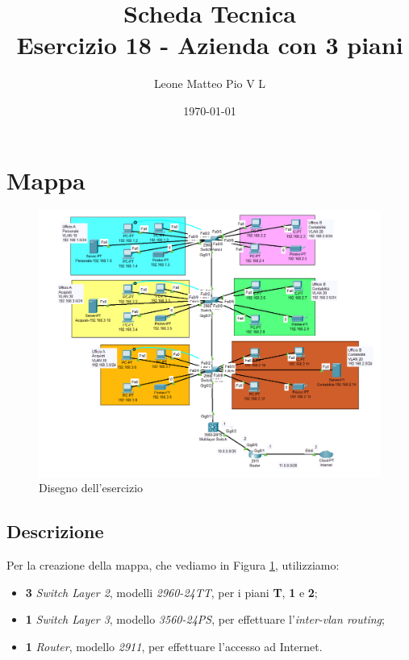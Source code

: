 \documentclass[12pt]{article}
\title{Scheda Tecnica \\ 
        Esercizio 18 - Azienda con 3 piani}
\author{Leone Matteo Pio V L}
\date{\today}
\begin{document}
    \maketitle
    \tableofcontents
    \fancyhead[C]{}
    \fancyhead[L]{}
    \fancyhead[R]{}



    \newpage

    \noindent \section{Mappa}
        \begin{figure}[h!]
            \begin{center}
                \label{fig:mappa}
                \caption{Disegno dell'esercizio}
                \includegraphics[width = 15cm]{Assets/MappaCompleta.png}
            \end{center}
        \end{figure}

    \subsection{Descrizione}
    \noindent Per la creazione della mappa, che vediamo in Figura \ref*{fig:mappa}, utilizziamo: 
        \begin{itemize}
            \item \textbf{3} \textit{Switch Layer 2}, modelli \textit{2960-24TT}, per i piani \textbf{T}, \textbf{1} e 
                \textbf{2};
            \item \textbf{1} \textit{Switch Layer 3}, modello \textit{3560-24PS}, per effettuare l'\textit{inter-vlan routing};
            \item \textbf{1} \textit{Router}, modello \textit{2911}, per effettuare l'accesso ad Internet.
        \end{itemize} 
\end{document}
